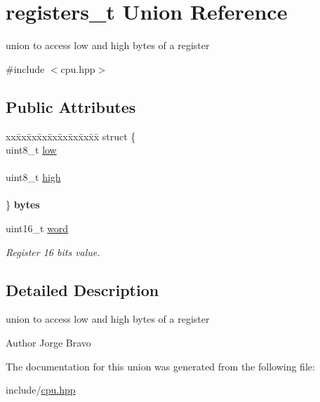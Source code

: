 \hypertarget{unionregisters__t}{}\section{registers\+\_\+t Union Reference}
\label{unionregisters__t}


union to access low and high bytes of a register  




{\ttfamily \#include $<$cpu.\+hpp$>$}

\subsection*{Public Attributes}
\begin{DoxyCompactItemize}
\item 
\begin{tabbing}
xx\=xx\=xx\=xx\=xx\=xx\=xx\=xx\=xx\=\kill
struct \{\\
\>uint8\_t \hyperlink{unionregisters__t_a90218968144f8ab6854f4f84c48a8bf3}{low}\\
\>\\
\>uint8\_t \hyperlink{unionregisters__t_a4af7cf9a0a1875eeca012e7046700530}{high}\\
\>\\
\} {\bfseries bytes}\hypertarget{unionregisters__t_aa3f1e458349df753d016393d8f188fec}{}\label{unionregisters__t_aa3f1e458349df753d016393d8f188fec}
\\

\end{tabbing}\item 
uint16\+\_\+t \hyperlink{unionregisters__t_a85608527b348c5806a7da3bb51579ce6}{word}\hypertarget{unionregisters__t_a85608527b348c5806a7da3bb51579ce6}{}\label{unionregisters__t_a85608527b348c5806a7da3bb51579ce6}

\begin{DoxyCompactList}\small\item\em Register 16 bits value. \end{DoxyCompactList}\end{DoxyCompactItemize}


\subsection{Detailed Description}
union to access low and high bytes of a register 

\begin{DoxyAuthor}{Author}
Jorge Bravo 
\end{DoxyAuthor}


The documentation for this union was generated from the following file\+:\begin{DoxyCompactItemize}
\item 
include/\hyperlink{cpu_8hpp}{cpu.\+hpp}\end{DoxyCompactItemize}
